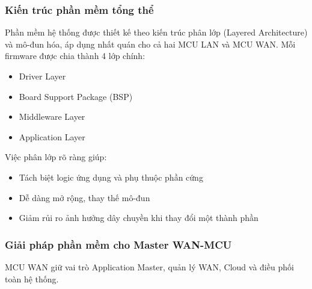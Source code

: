         \subsubsection{Kiến trúc phần mềm tổng thể}
            Phần mềm hệ thống được thiết kế theo kiến trúc phân lớp (Layered Architecture) và mô-đun hóa, áp dụng nhất quán cho cả hai MCU LAN và MCU WAN. Mỗi firmware được chia thành 4 lớp chính:
            \begin{itemize}
                \item Driver Layer
                \item Board Support Package (BSP)
                \item Middleware Layer
                \item Application Layer
            \end{itemize}
            Việc phân lớp rõ ràng giúp:
            \begin{itemize}
                \item Tách biệt logic ứng dụng và phụ thuộc phần cứng
                \item Dễ dàng mở rộng, thay thế mô-đun
                \item Giảm rủi ro ảnh hưởng dây chuyền khi thay đổi một thành phần
            \end{itemize}

            \subsubsection{Giải pháp phần mềm cho Master WAN-MCU}

            MCU WAN giữ vai trò Application Master, quản lý WAN, Cloud và điều phối toàn hệ thống.

